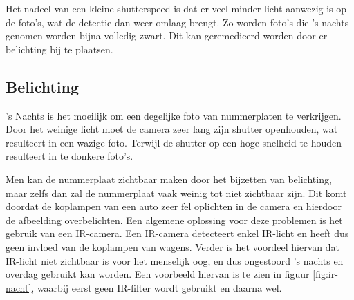 Het nadeel van een kleine shutterspeed is dat er veel minder licht aanwezig is op de foto's, wat de detectie dan weer omlaag brengt. Zo worden foto's die 's nachts genomen worden bijna volledig zwart. Dit kan geremedieerd worden door er belichting bij te plaatsen.

\subsection{Belichting}
's Nachts is het moeilijk om een degelijke foto van nummerplaten te verkrijgen. Door het weinige licht moet de camera zeer lang zijn shutter openhouden, wat resulteert in een wazige foto. Terwijl de shutter op een hoge snelheid te houden resulteert in te donkere foto's.

Men kan de nummerplaat zichtbaar maken door het bijzetten van belichting, maar zelfs dan zal de nummerplaat vaak weinig tot niet zichtbaar zijn. Dit komt doordat de koplampen van een auto zeer fel oplichten in de camera en hierdoor de afbeelding overbelichten. Een algemene oplossing voor deze problemen is het gebruik van een IR-camera. Een IR-camera detecteert enkel IR-licht en heeft dus geen invloed van de koplampen van wagens. Verder is het voordeel hiervan dat IR-licht niet zichtbaar is voor het menselijk oog, en dus ongestoord 's nachts en overdag gebruikt kan worden. Een voorbeeld hiervan is te zien in figuur \ref{fig:ir-nacht}, waarbij eerst geen IR-filter wordt gebruikt en daarna wel.


